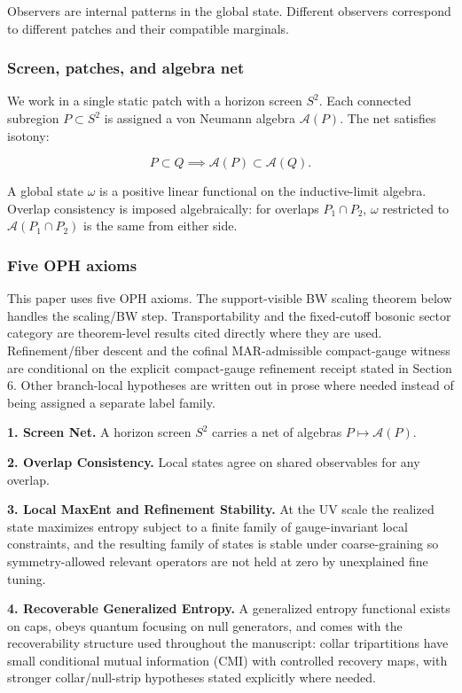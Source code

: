 Observers are internal patterns in the global state. Different observers correspond to different patches and their compatible marginals.

\subsubsection{Screen, patches, and algebra net}\label{12-screen-patches-and-algebra-net}

We work in a single static patch with a horizon screen \(S^2\). Each connected subregion \(P \subset S^2\) is assigned a von Neumann algebra \(\mathcal{A}(P)\). The net satisfies isotony:

\[
P \subset Q \implies \mathcal{A}(P) \subset \mathcal{A}(Q).
\]

A global state \(\omega\) is a positive linear functional on the inductive-limit algebra. Overlap consistency is imposed algebraically: for overlaps \(P_1 \cap P_2\), \(\omega\) restricted to \(\mathcal{A}(P_1 \cap P_2)\) is the same from either side.

\subsubsection{Five OPH axioms}\label{13-core-axioms}

This paper uses five OPH axioms. The support-visible BW scaling theorem below handles the scaling/BW step. Transportability and the fixed-cutoff bosonic sector category are theorem-level results cited directly where they are used. Refinement/fiber descent and the cofinal MAR-admissible compact-gauge witness are conditional on the explicit compact-gauge refinement receipt stated in Section 6. Other branch-local hypotheses are written out in prose where needed instead of being assigned a separate label family.

\textbf{1. Screen Net.} A horizon screen \(S^2\) carries a net of algebras \(P \mapsto \mathcal{A}(P)\).

\textbf{2. Overlap Consistency.} Local states agree on shared observables for any overlap.

\textbf{3. Local MaxEnt and Refinement Stability.} At the UV scale the realized state maximizes entropy subject to a finite family of gauge-invariant local constraints, and the resulting family of states is stable under coarse-graining so symmetry-allowed relevant operators are not held at zero by unexplained fine tuning.

\textbf{4. Recoverable Generalized Entropy.} A generalized entropy functional exists on caps, obeys quantum focusing on null generators, and comes with the recoverability structure used throughout the manuscript: collar tripartitions have small conditional mutual information (CMI) with controlled recovery maps, with stronger collar/null-strip hypotheses stated explicitly where needed.


